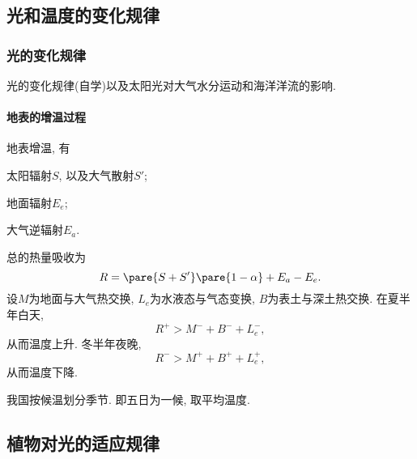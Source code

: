 \documentclass{ctexart}
\begin{document}


\subsection{光和温度的变化规律} %
\label{sub:光和温度的变化规律}

\subsubsection{光的变化规律} %
\label{ssub:光的变化规律}

光的变化规律(自学)以及太阳光对大气水分运动和海洋洋流的影响.

\paragraph{地表的增温过程} %
\label{par:地表的增温过程}

地表增温, 有
\begin{cenum}
    \item 太阳辐射$S$, 以及大气散射$S'$;
    \item 地面辐射$E_e$;
    \item 大气逆辐射$E_a$.
\end{cenum}
总的热量吸收为
\[ R = \pare{S+S'}\pare{1-\alpha} + E_a - E_e. \]
设$M$为地面与大气热交换, $L_e$为水液态与气态变换, $B$为表土与深土热交换. 在夏半年白天,
\[ R^+ > M^- + B^- + L_e^-, \]
从而温度上升. 冬半年夜晚,
\[ R^- > M^+ + B^+ + L_e^+, \]
从而温度下降.
\par
我国按候温划分季节. 即五日为一候, 取平均温度.




\subsection{植物对光的适应规律} %
\label{sub:植物对光的适应规律}
\end{document}
